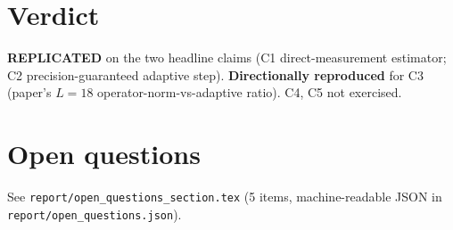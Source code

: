 \documentclass[11pt]{article}
\begin{document}
\section{Verdict}

\textbf{REPLICATED} on the two headline claims (C1 direct-measurement estimator; C2
precision-guaranteed adaptive step). \textbf{Directionally reproduced} for C3 (paper's
$L=18$ operator-norm-vs-adaptive ratio). C4, C5 not exercised.

\section{Open questions}

See \texttt{report/open\_questions\_section.tex} (5 items, machine-readable JSON in
\texttt{report/open\_questions.json}).
\end{document}
